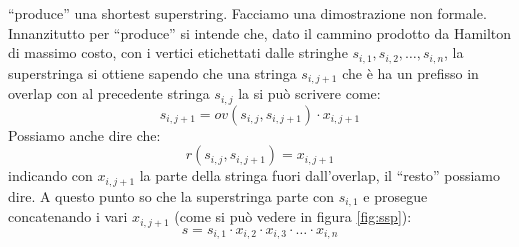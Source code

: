 \documentclass[a4paper,12pt, oneside]{book}
\begin{document}
``produce'' una shortest superstring. Facciamo una dimostrazione non
formale. Innanzitutto per ``produce'' si intende che, dato il cammino prodotto
da Hamilton di massimo costo, con i vertici etichettati dalle stringhe
$s_{i,1},s_{i,2},\ldots,s_{i,n}$, la superstringa si ottiene sapendo che una
stringa $s_{i,j+1}$ che è ha un prefisso in overlap con al precedente stringa
$s_{i,j}$ la si può scrivere come: 
\[s_{i,j+1}=ov(s_{i,j},s_{i,j+1})\cdot x_{i,j+1}\]
Possiamo anche dire che:
\[r(s_{i,j},s_{i,j+1})=x_{i,j+1}\]
indicando con $x_{i,j+1}$ la parte della stringa fuori dall'overlap, il
``resto'' possiamo dire. A questo
punto so che la superstringa parte con $s_{i,1}$ e prosegue concatenando i vari
$x_{i,j+1}$ (come si può vedere in figura \ref{fig:ssp}):
\[s=s_{i,1}\cdot x_{i,2}\cdot x_{i,3}\cdot\ldots\cdot  x_{i,n}\]
\end{document}

